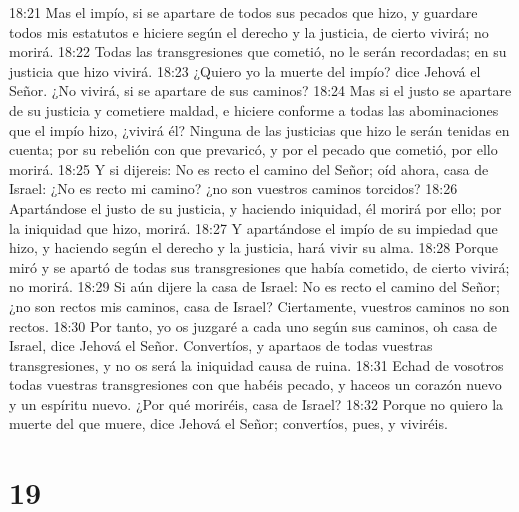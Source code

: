 18:21 Mas el impío, si se apartare de todos sus pecados que hizo, y guardare todos mis estatutos e hiciere según el derecho y la justicia, de cierto vivirá; no morirá.  
18:22 Todas las transgresiones que cometió, no le serán recordadas; en su justicia que hizo vivirá.  
18:23 ¿Quiero yo la muerte del impío? dice Jehová el Señor. ¿No vivirá, si se apartare de sus caminos?  
18:24 Mas si el justo se apartare de su justicia y cometiere maldad, e hiciere conforme a todas las abominaciones que el impío hizo, ¿vivirá él? Ninguna de las justicias que hizo le serán tenidas en cuenta; por su rebelión con que prevaricó, y por el pecado que cometió, por ello morirá.  
18:25 Y si dijereis: No es recto el camino del Señor; oíd ahora, casa de Israel: ¿No es recto mi camino? ¿no son vuestros caminos torcidos?  
18:26 Apartándose el justo de su justicia, y haciendo iniquidad, él morirá por ello; por la iniquidad que hizo, morirá.  
18:27 Y apartándose el impío de su impiedad que hizo, y haciendo según el derecho y la justicia, hará vivir su alma.  
18:28 Porque miró y se apartó de todas sus transgresiones que había cometido, de cierto vivirá; no morirá.  
18:29 Si aún dijere la casa de Israel: No es recto el camino del Señor; ¿no son rectos mis caminos, casa de Israel? Ciertamente, vuestros caminos no son rectos.  
18:30 Por tanto, yo os juzgaré a cada uno según sus caminos, oh casa de Israel, dice Jehová el Señor. Convertíos, y apartaos de todas vuestras transgresiones, y no os será la iniquidad causa de ruina.  
18:31 Echad de vosotros todas vuestras transgresiones con que habéis pecado, y haceos un corazón nuevo y un espíritu nuevo. ¿Por qué moriréis, casa de Israel?  
18:32 Porque no quiero la muerte del que muere, dice Jehová el Señor; convertíos, pues, y viviréis.  

\chapter{19}

